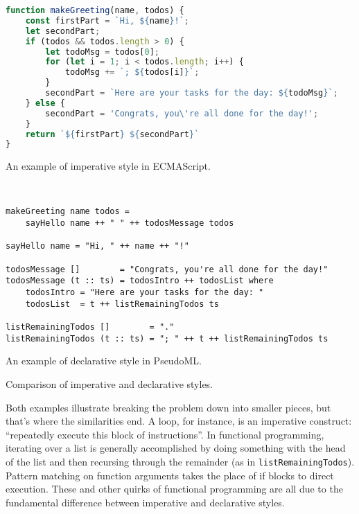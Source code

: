 \documentclass{book}
\newcommand{\mlil}[1]{\lstinline[language=pseudoml,columns=fixed]|#1|}\usepackage{caption}
\begin{document}
\begin{listing}
\begin{sublisting}{\linewidth}
\begin{lstlisting}[language=js]
function makeGreeting(name, todos) {
    const firstPart = `Hi, ${name}!`;
    let secondPart;
    if (todos && todos.length > 0) {
        let todoMsg = todos[0];
        for (let i = 1; i < todos.length; i++) {
            todoMsg += `; ${todos[i]}`;
        }
        secondPart = `Here are your tasks for the day: ${todoMsg}`;
    } else {
        secondPart = 'Congrats, you\'re all done for the day!';
    }
    return `${firstPart} ${secondPart}`
}
\end{lstlisting}
\caption{An example of imperative style in ECMAScript.}\label{lst:compare-id-imperative}
\end{sublisting}
\\[0.1\textheight]
\begin{sublisting}{\linewidth}
\begin{lstlisting}[language=pseudoml]
makeGreeting name todos =
    sayHello name ++ " " ++ todosMessage todos 

sayHello name = "Hi, " ++ name ++ "!"

todosMessage []        = "Congrats, you're all done for the day!"
todosMessage (t :: ts) = todosIntro ++ todosList where
    todosIntro = "Here are your tasks for the day: " 
    todosList  = t ++ listRemainingTodos ts

listRemainingTodos []        = "."
listRemainingTodos (t :: ts) = "; " ++ t ++ listRemainingTodos ts
\end{lstlisting}
\caption{An example of declarative style in PseudoML.}\label{lst:compare-id-declarative}
\end{sublisting}
\caption{Comparison of imperative and declarative styles.}\label{lst:compare-imperative-declarative}
\end{listing}

Both examples illustrate breaking the problem down into smaller pieces, but that's where the similarities end. A loop, for instance, is an imperative construct: ``repeatedly execute this block of instructions''. In functional programming, iterating over a list is generally accomplished by doing something with the head of the list and then recursing through the remainder (as in \mlil{listRemainingTodos}). Pattern matching on function arguments takes the place of if blocks to direct execution. These and other quirks of functional programming are all due to the fundamental difference between imperative and declarative styles.
\end{document}
